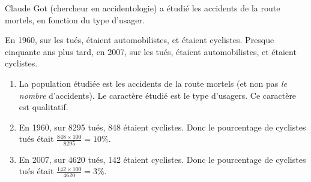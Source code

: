 \documentclass[12pt]{article}
\begin{document}
\begin{exercice}
  Claude Got (chercheur en accidentologie) a étudié les accidents de la route
  mortels, en fonction du type d'usager.

  En 1960, sur les  tués,  étaient automobilistes, et  étaient
  cyclistes. Presque cinquante ans plus tard, en 2007, sur les  tués, 
    étaient automobilistes, et  étaient cyclistes.

  \begin{enumerate}[(1)]
    \item La population étudiée est les accidents de la route mortels (et non pas \emph{le nombre} d'accidents). Le caractère étudié est le type d'usagers. Ce caractère est qualitatif.
    \item En 1960, sur 8295 tués, 848 étaient cyclistes. Donc le pourcentage de cyclistes tués était $\frac{848\times100}{8295}=10\%$.
    \item En 2007, sur 4620 tués, 142 étaient cyclistes. Donc le pourcentage de cyclistes tués était $\frac{142\times100}{4620}=3\%$.
  \end{enumerate}
\end{exercice}
\end{document}
